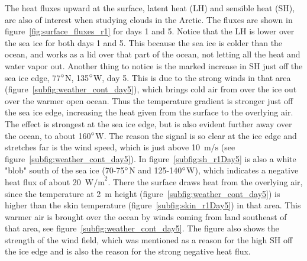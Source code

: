 The heat fluxes upward at the surface, latent heat (LH) and sensible heat (SH), are also of interest when studying clouds in the Arctic. The fluxes are shown in figure~\ref{fig:surface_fluxes_r1} for days 1 and 5. Notice that the LH is lower over the sea ice for both days 1 and 5. This because the sea ice is colder than the ocean, and works as a lid over that part of the ocean, not letting all the heat and water vapor out. Another thing to notice is the marked increase in SH just off the sea ice edge, 77$\degree$N, 135$\degree$W, day 5. This is due to the strong winds in that area (figure~\ref{subfig:weather_cont_day5}), which brings cold air from over the ice out over the warmer open ocean. Thus the temperature gradient is stronger just off the sea ice edge, increasing the heat given from the surface to the overlying air. The effect is strongest at the sea ice edge, but is also evident further away over the ocean, to about 160$\degree$W. The reason the signal is so clear at the ice edge and stretches far is the wind speed, which is just above 10~$\text{m/s}$ (see figure~\ref{subfig:weather_cont_day5}). In figure~\ref{subfig:sh_r1Day5} is also a white "blob" south of the sea ice (70-75$\degree$N and 125-140$\degree$W), which indicates a negative heat flux of about 20~$\text{W/m}^2$. There the surface draws heat from the overlying air, since the temperature at 2~m height (figure~\ref{subfig:weather_cont_day5}) is higher than the skin temperature (figure~\ref{subfig:skin_r1Day5}) in that area. This warmer air is brought over the ocean by winds coming from land southeast of that area, see figure~\ref{subfig:weather_cont_day5}. The figure also shows the strength of the wind field, which was mentioned as a reason for the high SH off the ice edge and is also the reason for the strong negative heat flux.

